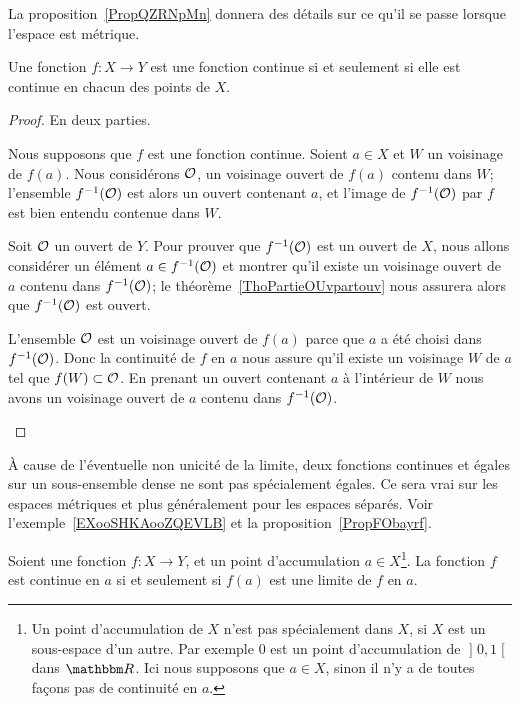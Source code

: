 La proposition~\ref{PropQZRNpMn} donnera des détails sur ce qu'il se passe lorsque l'espace est métrique.

\begin{theorem} \label{ThoESCaraB}
    Une fonction \( f\colon X\to Y\) est une fonction continue si et seulement si elle est continue en chacun des points de \( X\).
\end{theorem}

\begin{proof}
    En deux parties.
    \begin{subproof}
    \item[Sens direct]
        Nous supposons que \( f\) est une fonction continue. Soient \( a\in X\) et \( W\) un voisinage de \( f(a)\). Nous considérons \( \mathcal{O}\), un voisinage ouvert de \( f(a)\) contenu dans \( W\); l'ensemble \( f^{-1}(\mathcal{O})\) est alors un ouvert contenant \( a\), et l'image de \( f^{-1}(\mathcal{O})\) par \( f\) est bien entendu contenue dans \( W\).

    \item[Sens inverse]

        Soit \( \mathcal{O}\) un ouvert de \( Y\). Pour prouver que \( f^{-1}(\mathcal{O})\) est un ouvert de \( X\), nous allons considérer un élément \( a\in f^{-1}(\mathcal{O})\) et montrer qu'il existe un voisinage ouvert de \( a\) contenu dans \( f^{-1}(\mathcal{O})\); le théorème~\ref{ThoPartieOUvpartouv} nous assurera alors que \( f^{-1}(\mathcal{O})\) est ouvert.

        L'ensemble \( \mathcal{O}\) est un voisinage ouvert de \( f(a)\) parce que \( a\) a été choisi dans \( f^{-1}(\mathcal{O})\). Donc la continuité de \( f\) en \( a\) nous assure qu'il existe un voisinage \( W\) de \( a\) tel que \( f(W)\subset\mathcal{O}\). En prenant un ouvert contenant \( a\) à l'intérieur de \( W\) nous avons un voisinage ouvert de \( a\) contenu dans \( f^{-1}(\mathcal{O})\).
    \end{subproof}
\end{proof}

\begin{remark}
    À cause de l'éventuelle non unicité de la limite, deux fonctions continues et égales sur un sous-ensemble dense ne sont pas spécialement égales. Ce sera vrai sur les espaces métriques et plus généralement pour les espaces séparés. Voir l'exemple~\ref{EXooSHKAooZQEVLB} et la proposition~\ref{PropFObayrf}.
\end{remark}

\begin{lemma}
Soient une fonction \( f\colon X\to Y\), et un point d'accumulation \( a\in X\)\footnote{Un point d'accumulation de \( X\) n'est pas spécialement dans \( X\), si \( X\) est un sous-espace d'un autre. Par exemple \( 0\) est un point d'accumulation de \( \mathopen] 0 , 1 \mathclose[\) dans \( \eR\). Ici nous supposons que \( a\in X\), sinon il n'y a de toutes façons pas de continuité en \( a\).}. La fonction \( f\) est continue en \( a\) si et seulement si \( f(a)\) est une limite de \( f\) en \( a\).
\end{lemma}

